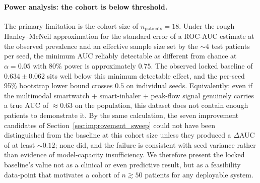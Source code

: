 \documentclass[11pt,a4paper]{article}
\begin{document}
\paragraph{Power analysis: the cohort is below threshold.}
The primary limitation is the cohort size of $n_\text{patients}{=}18$.
Under the rough Hanley--McNeil approximation for the standard error of
a ROC-AUC estimate at the observed prevalence and an effective sample
size set by the $\sim$4 test patients per seed, the minimum AUC
reliably detectable as different from chance at $\alpha\!=\!0.05$ with
$80\%$ power is approximately $\mathbf{0.75}$.  The observed locked
baseline of $0.634\pm0.062$ sits well below this minimum detectable
effect, and the per-seed 95\% bootstrap lower bound crosses $0.5$ on
individual seeds.  Equivalently: even if the multimodal smartwatch +
smart-inhaler + peak-flow signal genuinely carries a true AUC of
${\approx}0.63$ on the population, this dataset does not contain enough
patients to demonstrate it.  By the same calculation, the seven
improvement candidates of Section~\ref{sec:improvement_sweep} could not
have been distinguished from the baseline at this cohort size unless
they produced a $\Delta$AUC of at least ${\sim}0.12$; none did, and
the failure is consistent with seed variance rather than evidence of
model-capacity insufficiency.  We therefore present the locked
baseline's value not as a clinical or even predictive result, but as a
feasibility data-point that motivates a cohort of $n\!\gtrsim\!50$
patients for any deployable system.
\end{document}

